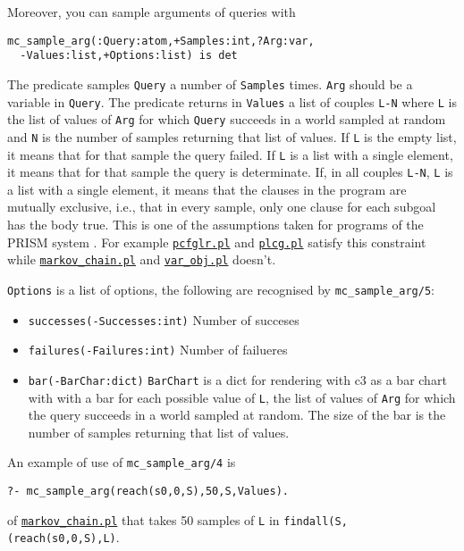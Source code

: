 Moreover, you can sample arguments of queries with
\begin{verbatim}
mc_sample_arg(:Query:atom,+Samples:int,?Arg:var,
  -Values:list,+Options:list) is det
\end{verbatim}
The predicate samples \verb|Query| a number of \verb|Samples| times.
\verb|Arg| should be a variable in \verb|Query|.
The predicate returns in \verb|Values| a list of couples \verb|L-N| where
\verb|L| is the list of values of \verb|Arg| for which \verb|Query|
succeeds in a world sampled at random and \verb|N|
is the number of samples returning that list of values.
If \verb|L| is the empty list, it means that for that
sample the query failed.
If \verb|L| is a list with a
single element, it means that for that sample the query is
determinate.
If, in all couples \verb|L-N|, \verb|L|
is a list with a
single element, it means that the clauses in the program
are mutually exclusive, i.e., that in every sample, only
one clause for each subgoal has the body true. This is one
of the assumptions taken for programs of the PRISM system \cite{DBLP:journals/jair/SatoK01}.
For example
\href{http://cplint.eu/example/inference/pcfglr.pl}{\texttt{pcfglr.pl}} and \href{http://cplint.eu/example/inference/plcg.pl}{\texttt{plcg.pl}} satisfy this constraint while
 \href{http://cplint.eu/example/inference/markov_chain.pl}{\texttt{markov\_chain.pl}} and \href{http://cplint.eu/example/inference/var_obj.pl}{\texttt{var\_obj.pl}} doesn't.

\verb|Options| is a list of options, the following are recognised by \verb|mc_sample_arg/5|:
\begin{itemize}
\item \verb|successes(-Successes:int)|
Number of succeses
\item \verb|failures(-Failures:int)|
Number of failueres
\item \verb|bar(-BarChar:dict)|
\verb|BarChart| is a dict for rendering with c3 as a bar chart with
 with a bar for each possible value of \verb|L|, the list of values of 
 \verb|Arg| for which the query succeeds in a world sampled at random. 
 The size of the bar is the number of samples
returning that list of values.
\end{itemize}


An example of use of \verb|mc_sample_arg/4| is
\begin{verbatim}
?- mc_sample_arg(reach(s0,0,S),50,S,Values).
\end{verbatim}
of \href{http://cplint.eu/example/inference/markov_chain.pl}{\texttt{markov\_chain.pl}}
that takes 50 samples of \verb|L| in \verb|findall(S,(reach(s0,0,S),L)|.

